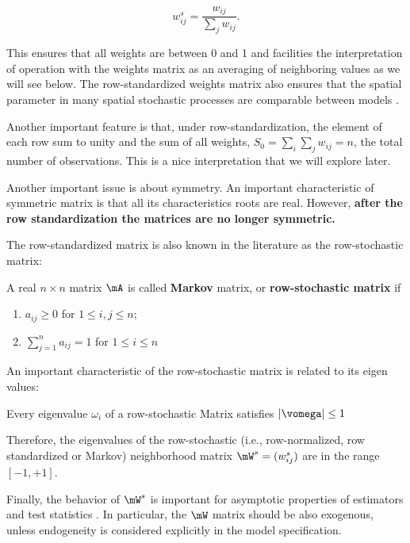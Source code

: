 \begin{equation*}
w_{ij}^s = \frac{w_{ij}}{\sum_j w_{ij}}.
\end{equation*}

This ensures that all weights are between 0 and 1 and facilities the interpretation of operation with the weights matrix as an averaging of neighboring values as we will see below. The row-standardized weights matrix also ensures that the spatial parameter in many spatial stochastic processes are comparable between models  \citep{AnselinBera1998}.

Another important feature is that, under row-standardization, the element of each row sum to unity and the sum of all weights, $S_0 = \sum_i\sum_j w_{ij} = n$, the total number of observations. This is a nice interpretation that we will explore later.

Another important issue is about symmetry. An important characteristic of symmetric matrix is that all its characteristics roots are real. However, \textbf{after the row standardization the matrices are no longer symmetric.} 

The row-standardized matrix is also known in the literature as the row-stochastic matrix:


\begin{definition}
	A real $n\times n$ matrix $\mA$ is called \textbf{Markov} matrix, or \textbf{row-stochastic matrix} if 
		\begin{enumerate}
			\item $a_{ij} \geq 0$ for $1\leq i, j \leq n$;
			\item $\sum_{j=1}^n a_{ij} = 1$ for $1\leq i \leq n$
		\end{enumerate}
\end{definition}


An important characteristic of the row-stochastic matrix is related to its eigen values:


\begin{theorem}\label{teo:eigen_values}
	Every eigenvalue $\omega_i$ of a row-stochastic Matrix satisfies $\left|\vomega\right|\leq 1$
\end{theorem}

Therefore, the eigenvalues of the row-stochastic (i.e., row-normalized, row standardized or Markov) neighborhood matrix $\mW^s=(w_{ij}^s)$ are in the range $\left[-1, +1\right]$.

Finally, the behavior of $\mW^s$ is important for asymptotic properties of estimators and test statistics \citep[][pp. 244]{AnselinBera1998}. In particular, the $\mW$ matrix should be also exogenous, unless endogeneity is considered explicitly in the model specification. 


